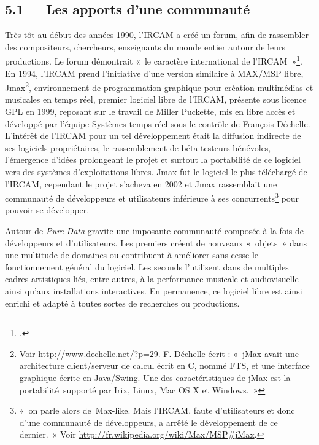 \documentclass{FramateX}
\begin{document}
\begin{refsection}
\subsection*{5.1~~~Les apports d'une communauté}
{}

Très tôt au début des années 1990, l'IRCAM a créé un forum, afin de
rassembler des compositeurs, chercheurs, enseignants du monde entier
autour de leurs productions. Le forum démontrait «~le caractère
international de l'IRCAM~»\footnote{\cite[p.~543]{Dufrene2007}.}. En 1994,
l'IRCAM prend l'initiative d'une version similaire à MAX/MSP libre,
Jmax\footnote{Voir \url{http://www.dechelle.net/?p=29}. F. Déchelle écrit : «~jMax avait une
architecture client/serveur de calcul écrit en C, nommé FTS, et une
interface graphique écrite en Java/Swing. Une des caractéristiques de
jMax est la portabilité~supporté par Irix, Linux, Mac OS X et
Windows.~»}, environnement de programmation graphique pour création
multimédias et musicales en temps réel, premier logiciel libre de
l'IRCAM, présente sous licence GPL en 1999, reposant sur le travail de
Miller Puckette, mis en libre accès et développé par l'équipe Systèmes
temps réel sous le contrôle de François
Déchelle. L'intérêt de
l'IRCAM pour un tel développement était la diffusion indirecte de ses
logiciels propriétaires, le rassemblement de béta-testeurs bénévoles,
l'émergence d'idées prolongeant le projet et surtout la portabilité de
ce logiciel vers des systèmes d'exploitations libres. Jmax fut le
logiciel le plus téléchargé de l'IRCAM, cependant le projet s'acheva en
2002 et Jmax rassemblait une communauté de développeurs et utilisateurs
inférieure à ses concurrents\footnote{«~on parle alors de~Max-like.
Mais l'IRCAM, faute d'utilisateurs et
donc d'une communauté de développeurs, a arrêté le
développement de ce dernier.~» Voir \url{http://fr.wikipedia.org/wiki/Max/MSP\#jMax}.} pour pouvoir se développer.


Autour de \textit{Pure Data} gravite une imposante communauté composée à la fois
de développeurs et d'utilisateurs. Les premiers créent
de nouveaux «~objets~» dans une multitude de domaines ou contribuent à
améliorer sans cesse le fonctionnement général du logiciel. Les seconds
l'utilisent dans de multiples cadres artistiques liés,
entre autres, à la performance musicale et audiovisuelle ainsi
qu'aux installations interactives. En permanence, ce
logiciel libre est ainsi enrichi et adapté à toutes sortes de
recherches ou productions. 


\end{refsection}
\end{document}
